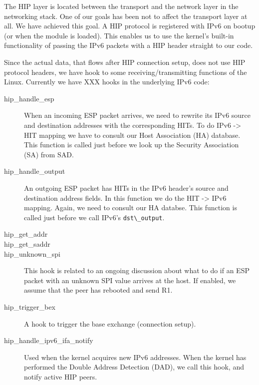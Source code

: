 
The HIP layer is located between the transport and the network layer
in the networking stack. One of our goals has been not to affect the
transport layer at all. We have achieved this goal. A HIP protocol is
registered with IPv6 on bootup (or when the module is loaded). This
enables us to use the kernel's built-in functionality of passing the
IPv6 packets with a HIP header straight to our code.

Since the actual data, that flows after HIP connection setup, does not
use HIP protocol headers, we have hook to some receiving/transmitting
functions of the Linux. Currently we have XXX hooks in the underlying
IPv6 code:

\begin{description}

\item[hip\_handle\_esp] When an incoming ESP packet arrives, we need to
  rewrite its IPv6 source and destination addresses with the
  corresponding HITs.  To do IPv6 -> HIT mapping we have to consult
  our Host Association (HA) database.  This function is called just
  before we look up the Security Association (SA) from SAD.

\item[hip\_handle\_output] An outgoing ESP packet has HITs in the IPv6
  header's source and destination address fields. In this function we
  do the HIT -> IPv6 mapping.  Again, we need to consult our HA
  databse. This function is called just before we call IPv6's
  \verb|dst\_output|.

\item[hip\_get\_addr]

\item[hip\_get\_saddr]

\item[hip\_unknown\_spi] This hook is related to an ongoing discussion about
  what to do if an ESP packet with an unknown SPI value arrives at the
  host.  If enabled, we assume that the peer has rebooted and send R1.

\item[hip\_trigger\_bex] A hook to trigger the base exchange (connection
      setup).

\item[hip\_handle\_ipv6\_ifa\_notify] Used when the kernel acquires new IPv6
  addresses.  When the kernel has performed the Double Address
  Detection (DAD), we call this hook, and notify active HIP peers.
\end{description}

